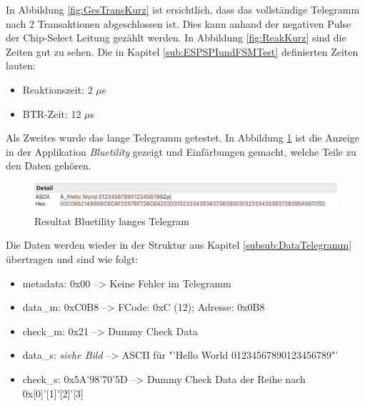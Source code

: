 In Abbildung \ref{fig:GesTransKurz} ist ersichtlich, dass das vollständige Telegramm nach 2 Transaktionen abgeschlossen ist. Dies kann anhand der negativen Pulse der Chip-Select Leitung gezählt werden.
In Abbildung \ref{fig:ReakKurz} sind die Zeiten gut zu sehen. Die in Kapitel \ref{sub:ESPSPIundFSMTest} definierten Zeiten lauten:
\begin{itemize}
    \item Reaktionszeit: 2 $\mu$s
    \item BTR-Zeit: 12 $\mu$s
\end{itemize}


Als Zweites wurde das lange Telegramm getestet. In Abbildung \ref{fig:ResultatBLELang} ist die Anzeige in der Applikation \textit{Bluetility} gezeigt und Einfärbungen gemacht, welche Teile zu den Daten gehören.

\begin{figure}[H]
    \centering
    \includegraphics[width=0.9\linewidth]{Figures/Chap4/ESP32/Resultat_BLE_lang.png}
    \caption{Resultat Bluetility langes Telegram}
    \label{fig:ResultatBLELang}
\end{figure}

Die Daten werden wieder in der Struktur aus Kapitel \ref{subsub:DataTelegramm} übertragen und sind wie folgt:

\begin{itemize}[noitemsep]
    \item metadata: 0x00 --> Keine Fehler im Telegramm
    \item data\_m: 0xC0B8 --> FCode: 0xC (12); Adresse: 0x0B8
    \item check\_m: 0x21 --> Dummy Check Data
    \item data\_s: \textit{siehe Bild} --> ASCII für "'Hello World 01234567890123456789"'
    \item check\_s: 0x5A'98'70'5D --> Dummy Check Data der Reihe nach 0x[0]'[1]'[2]'[3]
\end{itemize}

